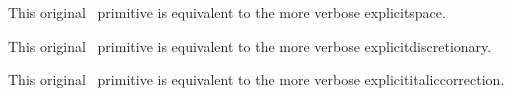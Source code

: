 \stopsection


\startsection[title=Primitives]

\startoldprimitive[title={\prm {<space>}}]

This original \TEX\ primitive is equivalent to the more verbose \prm
{explicitspace}.

\stopoldprimitive

\startoldprimitive[title={\prm {-}}]

This original \TEX\ primitive is equivalent to the more verbose \prm
{explicitdiscretionary}.

\stopoldprimitive

\startoldprimitive[title={\prm {/}}]

This original \TEX\ primitive is equivalent to the more verbose \prm
{explicititaliccorrection}.

\stopoldprimitive














